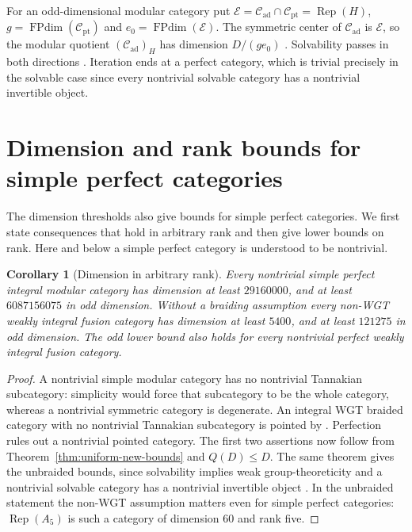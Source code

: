 \documentclass[11pt,a4paper]{article}
\numberwithin{equation}{section}
\newtheorem{corollary}[theorem]{Corollary}
\theoremstyle{remark}
\newcommand{\C}{\mathcal C}
\newcommand{\E}{\mathcal E}
\newcommand{\Rep}{\operatorname{Rep}}
\newcommand{\FPdim}{\operatorname{FPdim}}
\newcommand{\ad}{\mathrm{ad}}
\newcommand{\pt}{\mathrm{pt}}
\begin{document}
For an odd-dimensional modular category put
$\E=\C_{\ad}\cap\C_{\pt}=\Rep(H)$, $g=\FPdim(\C_{\pt})$ and
$e_0=\FPdim(\E)$. The symmetric center of $\C_{\ad}$ is $\E$, so
the modular quotient $(\C_{\ad})_H$ has dimension $D/(ge_0)$
\cite[Proposition~4.26 and Corollary~4.31(i)]{DGNO}. Solvability passes in both directions
\cite[Proposition~4.5(i), (iv)]{ENOsolvable}. Iteration ends at a perfect
category, which is trivial precisely in the solvable case since every
nontrivial solvable category has a nontrivial invertible object.

\section{Dimension and rank bounds for simple perfect categories}\label{sec:dimension-free-rank}
The dimension thresholds also give bounds for simple perfect categories. We first state consequences that hold in arbitrary rank and then give lower bounds on rank.
Here and below a simple perfect category is understood to be nontrivial.

\begin{corollary}[Dimension in arbitrary rank]\label{cor:global-dimensions}
Every nontrivial simple perfect integral modular category has dimension at least $29160000$, and at least $6087156075$ in odd dimension. Without a braiding assumption every non-WGT weakly integral fusion category has dimension at least $5400$, and at least $121275$ in odd dimension. The odd lower bound also holds for every nontrivial perfect weakly integral fusion category.
\end{corollary}
\begin{proof}
A nontrivial simple modular category has no nontrivial Tannakian subcategory: simplicity would force that subcategory to be the whole category, whereas a nontrivial symmetric category is degenerate. An integral WGT braided category with no nontrivial Tannakian subcategory is pointed by \cite[Theorem~3.1]{NataleCore}. Perfection rules out a nontrivial pointed category. The first two assertions now follow from Theorem~\ref{thm:uniform-new-bounds} and $Q(D)\le D$. The same theorem gives the unbraided bounds, since solvability implies weak group-theoreticity and a nontrivial solvable category has a nontrivial invertible object \cite[Proposition~4.5(iv)]{ENOsolvable}. In the unbraided statement the non-WGT assumption matters even for simple perfect categories: $\Rep(A_5)$ is such a category of dimension $60$ and rank five.
\end{proof}
\end{document}
